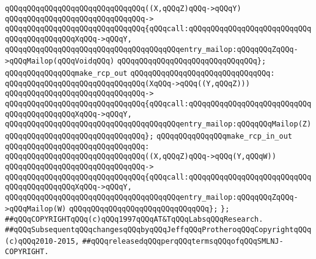 \verb|qQQqqQQqqQQqqQQqqQQqqQQqqQQqqQQq((X,qQQqZ)qQQq->qQQqY)|\newline
\verb|qQQqqQQqqQQqqQQqqQQqqQQqqQQqqQQq->|\newline
\verb|qQQqqQQqqQQqqQQqqQQqqQQqqQQqqQQq{qQQqcall:qQQqqQQqqQQqqQQqqQQqqQQqqQQqqQQqqQQqqQQqqQQqXqQQq->qQQqY,|\newline
\verb|qQQqqQQqqQQqqQQqqQQqqQQqqQQqqQQqqQQqqQQqentry_mailop:qQQqqQQqZqQQq->qQQqMailop(qQQqVoidqQQq)|\newline
\verb|qQQqqQQqqQQqqQQqqQQqqQQqqQQqqQQq};|\newline
\newline
\verb|qQQqqQQqqQQqqQQqmake_rcp_out|\newline
\verb|qQQqqQQqqQQqqQQqqQQqqQQqqQQqqQQq:|\newline
\verb|qQQqqQQqqQQqqQQqqQQqqQQqqQQqqQQq(XqQQq->qQQq((Y,qQQqZ)))|\newline
\verb|qQQqqQQqqQQqqQQqqQQqqQQqqQQqqQQq->|\newline
\verb|qQQqqQQqqQQqqQQqqQQqqQQqqQQqqQQq{qQQqcall:qQQqqQQqqQQqqQQqqQQqqQQqqQQqqQQqqQQqqQQqqQQqXqQQq->qQQqY,|\newline
\verb|qQQqqQQqqQQqqQQqqQQqqQQqqQQqqQQqqQQqqQQqentry_mailop:qQQqqQQqMailop(Z)|\newline
\verb|qQQqqQQqqQQqqQQqqQQqqQQqqQQqqQQq};|\newline
\newline
\verb|qQQqqQQqqQQqqQQqmake_rcp_in_out|\newline
\verb|qQQqqQQqqQQqqQQqqQQqqQQqqQQqqQQq:|\newline
\verb|qQQqqQQqqQQqqQQqqQQqqQQqqQQqqQQq((X,qQQqZ)qQQq->qQQq(Y,qQQqW))|\newline
\verb|qQQqqQQqqQQqqQQqqQQqqQQqqQQqqQQq->|\newline
\verb|qQQqqQQqqQQqqQQqqQQqqQQqqQQqqQQq{qQQqcall:qQQqqQQqqQQqqQQqqQQqqQQqqQQqqQQqqQQqqQQqqQQqXqQQq->qQQqY,|\newline
\verb|qQQqqQQqqQQqqQQqqQQqqQQqqQQqqQQqqQQqqQQqentry_mailop:qQQqqQQqZqQQq->qQQqMailop(W)|\newline
\verb|qQQqqQQqqQQqqQQqqQQqqQQqqQQqqQQq};|\newline
\newline
\verb|};|\newline
\newline
\newline
\verb|##qQQqCOPYRIGHTqQQq(c)qQQq1997qQQqAT&TqQQqLabsqQQqResearch.|\newline
\verb|##qQQqSubsequentqQQqchangesqQQqbyqQQqJeffqQQqProtheroqQQqCopyrightqQQq(c)qQQq2010-2015,|\newline
\verb|##qQQqreleasedqQQqperqQQqtermsqQQqofqQQqSMLNJ-COPYRIGHT.|\newline

